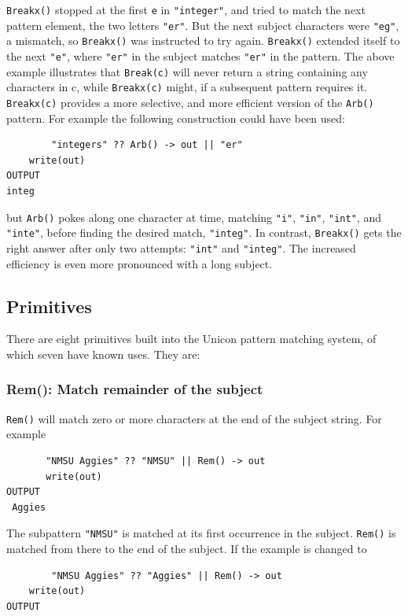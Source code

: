 \documentclass[letterpaper,12pt]{article}
\begin{document}
{\tt Breakx()} stopped at the first {\tt e} in {\tt "integer"},
and tried to match
the next pattern element, the two letters {\tt "er"}. But the next subject
characters were {\tt "eg"}, a mismatch, so {\tt Breakx()} was instructed to try
again. {\tt Breakx()} extended itself to the next {\tt "e"}, where
{\tt "er"} in the
subject matches {\tt "er"} in the pattern.  The above example illustrates
that {\tt Break(c)} will never return a string containing any characters in
c, while {\tt Breakx(c)} might, if a subsequent pattern requires it.
{\tt Breakx(c)} provides a more selective, and more efficient version of
the {\tt Arb()} pattern. For example the following construction could have
been used:

\begin{verbatim}
        "integers" ?? Arb() -> out || "er"
	write(out)
OUTPUT
integ
\end{verbatim}

\noindent
but {\tt Arb()} pokes along one character at time, matching
{\tt "i"}, {\tt "in"},
{\tt "int"}, and {\tt "inte"}, before finding the desired match,
{\tt "integ"}. In
contrast, {\tt Breakx()} gets the right answer after only two attempts:
{\tt "int"} and {\tt "integ"}. The increased efficiency is even more pronounced
with a long subject.

\subsection{Primitives}

There are eight primitives built into the Unicon pattern matching
system, of which seven have known uses. They are:

\subsubsection{Rem(): Match remainder of the subject}

{\tt Rem()} will match zero or more characters at the end of the subject
string. For example

\begin{verbatim}
       "NMSU Aggies" ?? "NMSU" || Rem() -> out
       write(out)
OUTPUT
 Aggies
\end{verbatim}

The subpattern {\tt "NMSU"} is matched at its first occurrence in the
subject. {\tt Rem()} is matched from there to the end of the subject.
If the example is changed to

\begin{verbatim}
        "NMSU Aggies" ?? "Aggies" || Rem() -> out
	write(out)
OUTPUT

\end{verbatim}
\end{document}
